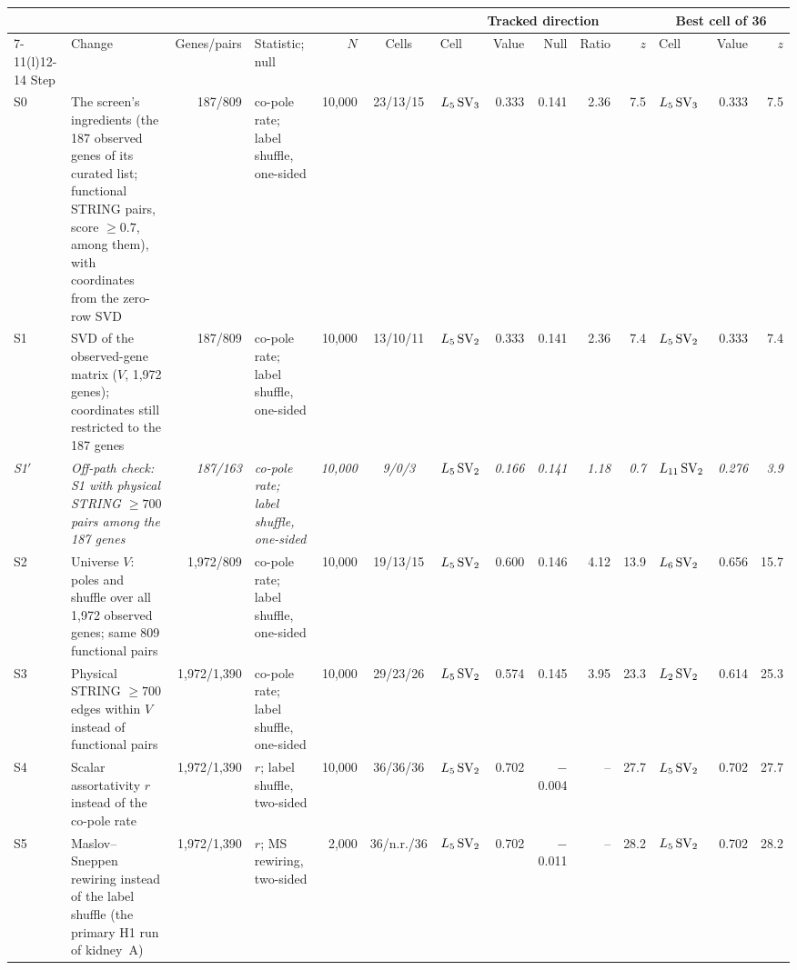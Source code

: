 \begin{table}[!htbp]
\scriptsize\setlength{\tabcolsep}{2pt}
\begin{tabular*}{\textwidth}{@{\extracolsep{\fill}}l>{\raggedright\arraybackslash}p{3.65cm}r>{\raggedright\arraybackslash}p{1.6cm}rclrrrrlrr@{}}
\toprule
& & & & & & \multicolumn{5}{c}{Tracked direction} & \multicolumn{3}{c}{Best cell of 36} \\
\cmidrule(lr){7-11}\cmidrule(l){12-14}
Step & Change & Genes/pairs & Statistic; null & $N$ & Cells & Cell & Value & Null & Ratio & $z$ & Cell & Value & $z$ \\
\midrule
S0 & The screen's ingredients (the 187 observed genes of its curated list; functional STRING pairs, score $\geq 0.7$, among them), with coordinates from the zero-row SVD & 187/809 & co-pole rate; label shuffle, one-sided & 10,000 & 23/13/15 & $L_{5}\,\mathrm{SV}_{3}$ & 0.333 & 0.141 & 2.36 & 7.5 & $L_{5}\,\mathrm{SV}_{3}$ & 0.333 & 7.5 \\
S1 & SVD of the observed-gene matrix ($V$, 1,972 genes); coordinates still restricted to the 187 genes & 187/809 & co-pole rate; label shuffle, one-sided & 10,000 & 13/10/11 & $L_{5}\,\mathrm{SV}_{2}$ & 0.333 & 0.141 & 2.36 & 7.4 & $L_{5}\,\mathrm{SV}_{2}$ & 0.333 & 7.4 \\
\itshape S1$'$ & \itshape Off-path check: S1 with physical STRING $\geq 700$ pairs among the 187 genes & \itshape 187/163 & \itshape co-pole rate; label shuffle, one-sided & \itshape 10,000 & \itshape 9/0/3 & \itshape $L_{5}\,\mathrm{SV}_{2}$ & \itshape 0.166 & \itshape 0.141 & \itshape 1.18 & \itshape 0.7 & \itshape $L_{11}\,\mathrm{SV}_{2}$ & \itshape 0.276 & \itshape 3.9 \\
S2 & Universe $V$: poles and shuffle over all 1,972 observed genes; same 809 functional pairs & 1,972/809 & co-pole rate; label shuffle, one-sided & 10,000 & 19/13/15 & $L_{5}\,\mathrm{SV}_{2}$ & 0.600 & 0.146 & 4.12 & 13.9 & $L_{6}\,\mathrm{SV}_{2}$ & 0.656 & 15.7 \\
S3 & Physical STRING $\geq 700$ edges within $V$ instead of functional pairs & 1,972/1,390 & co-pole rate; label shuffle, one-sided & 10,000 & 29/23/26 & $L_{5}\,\mathrm{SV}_{2}$ & 0.574 & 0.145 & 3.95 & 23.3 & $L_{2}\,\mathrm{SV}_{2}$ & 0.614 & 25.3 \\
S4 & Scalar assortativity $r$ instead of the co-pole rate & 1,972/1,390 & $r$; label shuffle, two-sided & 10,000 & 36/36/36 & $L_{5}\,\mathrm{SV}_{2}$ & 0.702 & $-$0.004 & -- & 27.7 & $L_{5}\,\mathrm{SV}_{2}$ & 0.702 & 27.7 \\
S5 & Maslov--Sneppen rewiring instead of the label shuffle (the primary H1 run of kidney~A) & 1,972/1,390 & $r$; MS rewiring, two-sided & 2,000 & 36/n.r./36 & $L_{5}\,\mathrm{SV}_{2}$ & 0.702 & $-$0.011 & -- & 28.2 & $L_{5}\,\mathrm{SV}_{2}$ & 0.702 & 28.2 \\
\bottomrule
\end{tabular*}
\end{table}

